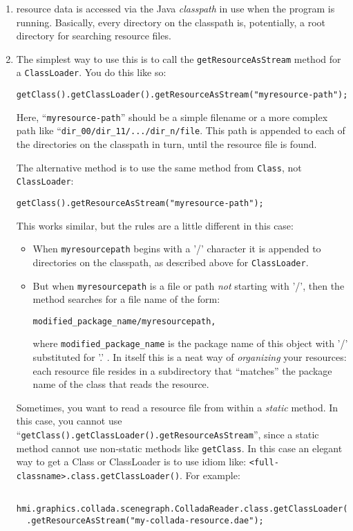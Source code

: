 \begin{enumerate}
\item resource data is accessed via the Java \emph{classpath} in use when the program is running.
Basically, every directory on the classpath is, potentially, a root directory for searching resource files.
\item The simplest way to use this is to call the \verb#getResourceAsStream# method for a \verb#ClassLoader#.
You do this like so:
\begin{verbatim}
getClass().getClassLoader().getResourceAsStream("myresource-path");
\end{verbatim}
Here, ``\verb#myresource-path#'' should be a simple filename or a more complex  path like ``\verb#dir_00/dir_11/.../dir_n/file#.
This path is appended to each of the directories on the classpath in turn, until the resource file is found.

\noindent
The alternative method is to use the same method from  \verb#Class#, not \verb#ClassLoader#:
\begin{verbatim}
getClass().getResourceAsStream("myresource-path");
\end{verbatim}
This works similar, but the rules are a little different in this case:
\begin{itemize}
\item When \verb#myresourcepath# begins with a '/' character it is appended to directories on the classpath, as described above for \verb#ClassLoader#.
\item But when \verb#myresourcepath# is a file or path \emph{not} starting with '/', then the method searches
for a file name of the form:
\begin{verbatim}
modified_package_name/myresourcepath,
\end{verbatim}
where \verb#modified_package_name# is the package name of this object with '/' substituted for '.' .
In itself this is a neat way of \emph{organizing} your resources: each resource file resides
in a subdirectory that ``matches'' the package name of the class that reads the resource.
\end{itemize}

\noindent
Sometimes, you want to read a resource file from within a \emph{static} method.
In this case, you cannot use ``\verb#getClass().getClassLoader().getResourceAsStream#'', since a static method cannot use
non-static methods like \verb#getClass#.
In this case an elegant way to get a Class or ClassLoader is to use idiom like: \verb#<full-classname>.class.getClassLoader()#.
For example:
\begin{verbatim}
 hmi.graphics.collada.scenegraph.ColladaReader.class.getClassLoader()
  .getResourceAsStream("my-collada-resource.dae");
 \end{verbatim}

\end{enumerate}


